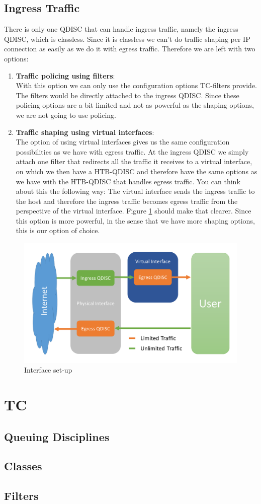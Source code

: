 \newpage
\subsection{Ingress Traffic} \label{Ingress Traffic}
There is only one \acs{QDISC} that can handle ingress traffic, namely the ingress \acs{QDISC}, which is classless. Since it is classless we can't do traffic shaping per \acs{IP} connection as easily as we do it with egress traffic. Therefore we are left with two options:
\begin{enumerate}
\item \textbf{Traffic policing using filters}:
\\With this option we can only use the configuration options \acs{TC}-filters provide. The filters would be directly attached to the ingress \acs{QDISC}. Since these policing options are a bit limited and not as powerful as the shaping options, we are not going to use policing.
\item \textbf{Traffic shaping using virtual interfaces}:
\\The option of using virtual interfaces gives us the same configuration possibilities as we have with egress traffic. At the ingress \acs{QDISC} we simply attach one filter that redirects all the traffic it receives to a virtual interface, on which we then have a \acs{HTB}-\acs{QDISC} and therefore have the same options as we have with the \acs{HTB}-\acs{QDISC} that handles egress traffic. You can think about this the following way: The virtual interface sends the ingress traffic to the host and therefore the ingress traffic becomes egress traffic from the perspective of the virtual interface. Figure \ref{Interface set-up} should make that clearer. Since this option is more powerful, in the sense that we have more shaping options, this is our option of choice.
\end{enumerate}

\begin{figure}[h]
	\centering
	\includegraphics[width=\textwidth]{img/Interface-Setup.png}
	\caption{Interface set-up}
	\label{Interface set-up}
\end{figure}

\section{TC} \label{TC}
\subsection{Queuing Disciplines}
\subsection{Classes}
\subsection{Filters}